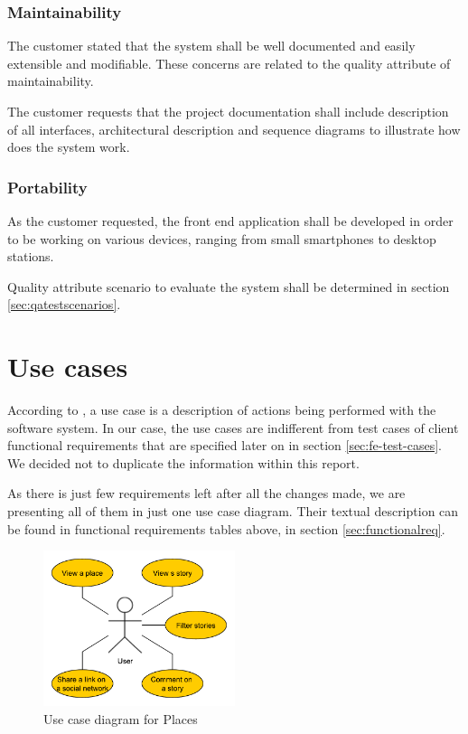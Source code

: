 \documentclass[11pt]{book}
\begin{document}
\subsubsection{Maintainability}
The customer stated that the system shall be well documented and easily extensible and modifiable. These concerns are related to the quality attribute of maintainability.

The customer requests that the project documentation shall include description of all interfaces, architectural description and sequence diagrams to illustrate how does the system work.

\subsubsection{Portability}
As the customer requested, the front end application shall be developed in order to be working on various devices, ranging from small smartphones to desktop stations.

Quality attribute scenario to evaluate the system shall be determined in section \ref{sec:qatestscenarios}.


\section{Use cases}
According to \cite{usecases}, a use case is a description of actions being performed with the software system. In our case, the use cases are indifferent from test cases of client functional requirements that are specified later on in section \ref{sec:fe-test-cases}. We decided not to duplicate the information within this report.

As there is just few requirements left after all the changes made, we are presenting all of them in just one use case diagram. Their textual description can be found in functional requirements tables above, in section \ref{sec:functionalreq}.

\begin{figure}[H]
      \centering
      \includegraphics[width=0.5\textwidth]{Figures/Requirements/final.pdf}
      \caption{Use case diagram for Places}
      \label{fig:req_usecase_walls}
\end{figure}
\end{document}
